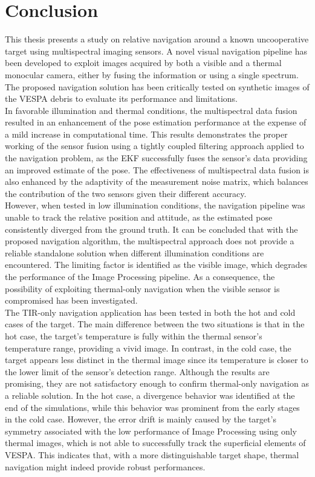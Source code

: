 \chapter{Conclusion}

This thesis presents a study on relative navigation around a known uncooperative target using multispectral imaging sensors. A novel visual navigation pipeline has been developed to exploit images acquired by both a visible and a thermal monocular camera, either by fusing the information or using a single spectrum. The proposed navigation solution has been critically tested on synthetic images of the VESPA debris to evaluate its performance and limitations.\\
In favorable illumination and thermal conditions, the multispectral data fusion resulted in an enhancement of the pose estimation performance at the expense of a mild increase in computational time. This results demonstrates the proper working of the sensor fusion using a tightly coupled filtering approach applied to the navigation problem, as the EKF successfully fuses the sensor's data providing an improved estimate of the pose. The effectiveness of multispectral data fusion is also enhanced by the adaptivity of the measurement noise matrix, which balances the contribution of the two sensors given their different accuracy.\\
However, when tested in low illumination conditions, the navigation pipeline was unable to track the relative position and attitude, as the estimated pose consistently diverged from the ground truth. It can be concluded that with the proposed navigation algorithm, the multispectral approach does not provide a reliable standalone solution when different illumination conditions are encountered. The limiting factor is identified as the visible image, which degrades the performance of the Image Processing pipeline. As a consequence, the possibility of exploiting thermal-only navigation when the visible sensor is compromised has been investigated.\\
The TIR-only navigation application has been tested in both the hot and cold cases of the target. The main difference between the two situations is that in the hot case, the target’s temperature is fully within the thermal sensor’s temperature range, providing a vivid image. In contrast, in the cold case, the target appears less distinct in the thermal image since its temperature is closer to the lower limit of the sensor’s detection range. Although the results are promising, they are not satisfactory enough to confirm thermal-only navigation as a reliable solution. In the hot case, a divergence behavior was identified at the end of the simulations, while this behavior was prominent from the early stages in the cold case. However, the error drift is mainly caused by the target’s symmetry associated with the low performance of Image Processing using only thermal images, which is not able to successfully track the superficial elements of VESPA. This indicates that, with a more distinguishable target shape, thermal navigation might indeed provide robust performances.\\
